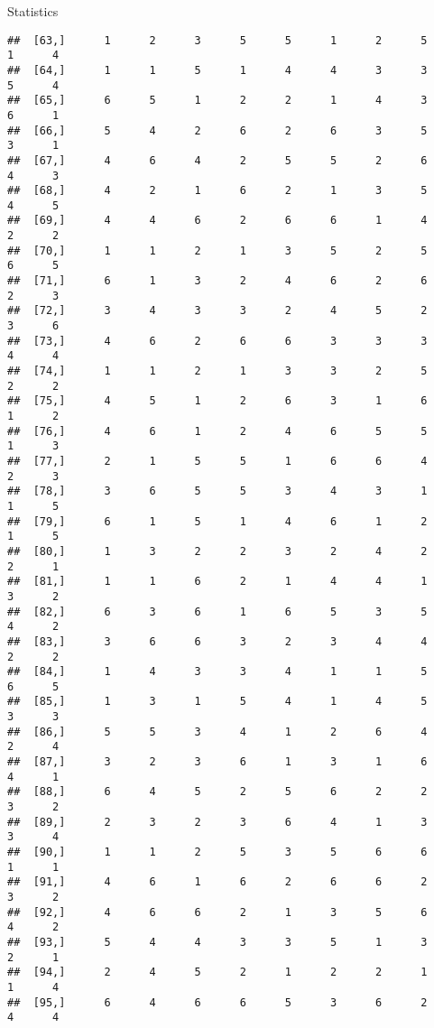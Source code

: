 \documentclass[
  ignorenonframetext,
]{beamer}
\begin{document}
\begin{frame}[fragile]{Statistics}
\begin{verbatim}
##  [63,]      1      2      3      5      5      1      2      5      1      4
##  [64,]      1      1      5      1      4      4      3      3      5      4
##  [65,]      6      5      1      2      2      1      4      3      6      1
##  [66,]      5      4      2      6      2      6      3      5      3      1
##  [67,]      4      6      4      2      5      5      2      6      4      3
##  [68,]      4      2      1      6      2      1      3      5      4      5
##  [69,]      4      4      6      2      6      6      1      4      2      2
##  [70,]      1      1      2      1      3      5      2      5      6      5
##  [71,]      6      1      3      2      4      6      2      6      2      3
##  [72,]      3      4      3      3      2      4      5      2      3      6
##  [73,]      4      6      2      6      6      3      3      3      4      4
##  [74,]      1      1      2      1      3      3      2      5      2      2
##  [75,]      4      5      1      2      6      3      1      6      1      2
##  [76,]      4      6      1      2      4      6      5      5      1      3
##  [77,]      2      1      5      5      1      6      6      4      2      3
##  [78,]      3      6      5      5      3      4      3      1      1      5
##  [79,]      6      1      5      1      4      6      1      2      1      5
##  [80,]      1      3      2      2      3      2      4      2      2      1
##  [81,]      1      1      6      2      1      4      4      1      3      2
##  [82,]      6      3      6      1      6      5      3      5      4      2
##  [83,]      3      6      6      3      2      3      4      4      2      2
##  [84,]      1      4      3      3      4      1      1      5      6      5
##  [85,]      1      3      1      5      4      1      4      5      3      3
##  [86,]      5      5      3      4      1      2      6      4      2      4
##  [87,]      3      2      3      6      1      3      1      6      4      1
##  [88,]      6      4      5      2      5      6      2      2      3      2
##  [89,]      2      3      2      3      6      4      1      3      3      4
##  [90,]      1      1      2      5      3      5      6      6      1      1
##  [91,]      4      6      1      6      2      6      6      2      3      2
##  [92,]      4      6      6      2      1      3      5      6      4      2
##  [93,]      5      4      4      3      3      5      1      3      2      1
##  [94,]      2      4      5      2      1      2      2      1      1      4
##  [95,]      6      4      6      6      5      3      6      2      4      4

\end{verbatim}
\end{frame}
\end{document}
